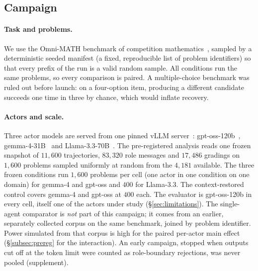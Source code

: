 \subsection{Campaign}
\label{sec:experiments}

\paragraph{Task and problems.} We use the Omni-MATH benchmark of competition
mathematics~\cite{gao2025omnimath}, sampled by a deterministic seeded
manifest (a fixed, reproducible list of problem identifiers) so that every
prefix of the run is a valid random sample. All conditions run the same
problems, so every comparison is paired. A multiple-choice benchmark was
ruled out before launch: on a four-option item, producing a different
candidate succeeds one time in three by chance, which would inflate
recovery.

\paragraph{Actors and scale.} Three actor models are served from one pinned
vLLM server~\cite{kwon2023vllm}: gpt-oss-120b~\cite{openai2025gptoss},
gemma-4-31B~\cite{gemma2026gemma4} and
Llama-3.3-70B~\cite{grattafiori2024llama3}. The pre-registered analysis reads one
frozen snapshot of $11{,}600$ trajectories, $83{,}320$ role messages and
$17{,}486$ gradings on $1{,}600$ problems
sampled uniformly at random from the $4{,}181$ available. The three frozen
conditions run $1{,}600$ problems per cell (one actor in one condition on
one domain) for gemma-4 and gpt-oss and $400$ for Llama-3.3. The
context-restored control covers gemma-4 and gpt-oss at $400$ each. The
evaluator is gpt-oss-120b in every cell, itself one of the actors under
study (\S\ref{sec:limitations}). The single-agent comparator is \emph{not}
part of this campaign; it comes from an earlier, separately collected corpus
on the same benchmark, joined by problem identifier. Power simulated from
that corpus is high for the paired per-actor main effect
(\S\ref{subsec:prereg} for the interaction). An early campaign, stopped when
outputs cut off at the token limit were counted as role-boundary rejections,
was never pooled (supplement).

